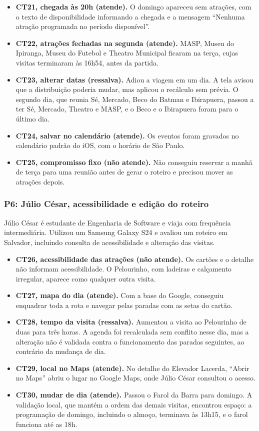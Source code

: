 \begin{itemize}
  \item \textbf{CT21, chegada às 20h (atende).} O domingo apareceu sem atrações, com o texto de disponibilidade informando a chegada e a mensagem ``Nenhuma atração programada no período disponível''.
  \item \textbf{CT22, atrações fechadas na segunda (atende).} MASP, Museu do Ipiranga, Museu do Futebol e Theatro Municipal ficaram na terça, cujas visitas terminaram às 16h54, antes da partida.
  \item \textbf{CT23, alterar datas (ressalva).} Adiou a viagem em um dia. A tela avisou que a distribuição poderia mudar, mas aplicou o recálculo sem prévia. O segundo dia, que reunia Sé, Mercado, Beco do Batman e Ibirapuera, passou a ter Sé, Mercado, Theatro e MASP, e o Beco e o Ibirapuera foram para o último dia.
  \item \textbf{CT24, salvar no calendário (atende).} Os eventos foram gravados no calendário padrão do iOS, com o horário de São Paulo.
  \item \textbf{CT25, compromisso fixo (não atende).} Não conseguiu reservar a manhã de terça para uma reunião antes de gerar o roteiro e precisou mover as atrações depois.
\end{itemize}

\subsubsection{P6: Júlio César, acessibilidade e edição do roteiro}

Júlio César é estudante de Engenharia de Software e viaja com frequência intermediária. Utilizou um Samsung Galaxy S24 e avaliou um roteiro em Salvador, incluindo consulta de acessibilidade e alteração das visitas.

\begin{itemize}
  \item \textbf{CT26, acessibilidade das atrações (não atende).} Os cartões e o detalhe não informam acessibilidade. O Pelourinho, com ladeiras e calçamento irregular, aparece como qualquer outra visita.
  \item \textbf{CT27, mapa do dia (atende).} Com a base do Google, conseguiu enquadrar toda a rota e navegar pelas paradas com as setas do cartão.
  \item \textbf{CT28, tempo da visita (ressalva).} Aumentou a visita ao Pelourinho de duas para três horas. A agenda foi recalculada sem conflito nesse dia, mas a alteração não é validada contra o funcionamento das paradas seguintes, ao contrário da mudança de dia.
  \item \textbf{CT29, local no Maps (atende).} No detalhe do Elevador Lacerda, ``Abrir no Maps'' abriu o lugar no Google Maps, onde Júlio César consultou o acesso.
  \item \textbf{CT30, mudar de dia (atende).} Passou o Farol da Barra para domingo. A validação local, que mantém a ordem das demais visitas, encontrou espaço: a programação de domingo, incluindo o almoço, terminava às 13h15, e o farol funciona até as 18h.
\end{itemize}

